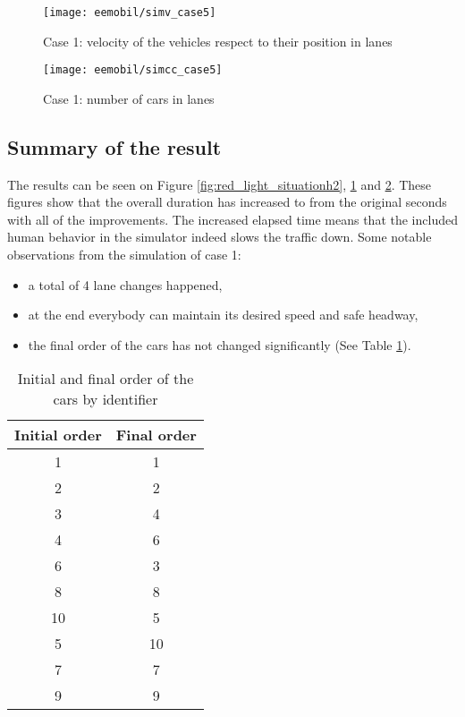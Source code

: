 			\begin{figure}
				\centering
				\texttt{[image: eemobil/simv\_case5]}
				\caption{Case 1: velocity of the vehicles respect to their position in lanes}
				\label{fig:red_light_situationv2}
			\end{figure}
			\begin{figure}
				\centering
				\texttt{[image: eemobil/simcc\_case5]}
				\caption{Case 1: number of cars in lanes}
				\label{fig:red_light_situationcc2}
			\end{figure}
			\subsection*{Summary of the result}
			The results can be seen on Figure \ref{fig:red_light_situationh2}, \ref{fig:red_light_situationv2} and \ref{fig:red_light_situationcc2}. These figures show that the overall duration has increased to from the original seconds with all of the improvements. The increased elapsed time means that the included human behavior in the simulator indeed slows the traffic down.
			Some notable observations from the simulation of case 1:
			
			\begin{itemize}
				\item a total of 4 lane changes happened,
				\item at the end everybody can maintain its desired speed and safe headway,
				\item the final order of the cars has not changed significantly (See Table \ref{tab:car_order_case_1}).
			\end{itemize}
			\begin{table}
				\begin{center}
					\begin{tabular}{ |c|c| }
						\hline
						Initial order & Final order \\
						\hline
						1 & 1\\
						2 & 2\\
						3 & 4\\
						4 & 6\\
						6 & 3\\
						8 & 8\\
						10 & 5\\
						5 & 10\\
						7 & 7\\
						9 & 9\\
						\hline
					\end{tabular}
				\end{center}
				\caption{Initial and final order of the cars by identifier}
				\label{tab:car_order_case_1}
			\end{table}
